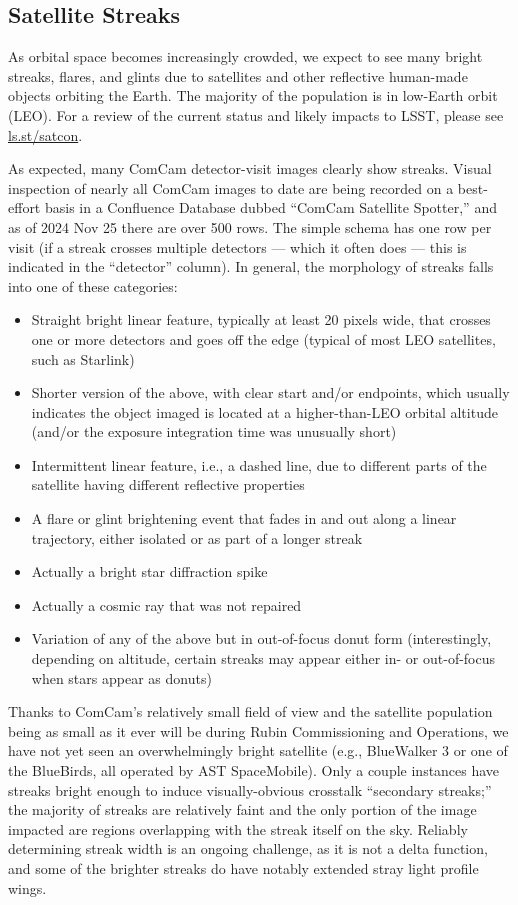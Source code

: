 \subsection{Satellite Streaks}

As orbital space becomes increasingly crowded, we expect to see many bright streaks, flares, and glints due to satellites and other reflective human-made objects orbiting the Earth. The majority of the population is in low-Earth orbit (LEO). For a review of the current status and likely impacts to LSST, please see \url{ls.st/satcon}.

As expected, many ComCam detector-visit images clearly show streaks. Visual inspection of nearly all ComCam images to date are being recorded on a best-effort basis in a Confluence Database dubbed ``ComCam Satellite Spotter,'' and as of 2024 Nov 25 there are over 500 rows. The simple schema has one row per visit (if a streak crosses multiple detectors --- which it often does --- this is indicated in the ``detector'' column). In general, the morphology of streaks falls into one of these categories:
\begin{itemize}
\item Straight bright linear feature, typically at least 20 pixels wide, that crosses one or more detectors and goes off the edge (typical of most LEO satellites, such as Starlink)
\item Shorter version of the above, with clear start and/or endpoints, which usually indicates the object imaged is located at a higher-than-LEO orbital altitude (and/or the exposure integration time was unusually short)
\item Intermittent linear feature, i.e., a dashed line, due to different parts of the satellite having different reflective properties
\item A flare or glint brightening event that fades in and out along a linear trajectory, either isolated or as part of a longer streak
\item Actually a bright star diffraction spike
\item Actually a cosmic ray that was not repaired
\item Variation of any of the above but in out-of-focus donut form (interestingly, depending on altitude, certain streaks may appear either in- or out-of-focus when stars appear as donuts)
\end{itemize}

Thanks to ComCam's relatively small field of view and the satellite population being as small as it ever will be during Rubin Commissioning and Operations, we have not yet seen an overwhelmingly bright satellite (e.g., BlueWalker 3 or one of the BlueBirds, all operated by AST SpaceMobile). Only a couple instances have streaks bright enough to induce visually-obvious crosstalk ``secondary streaks;'' the majority of streaks are relatively faint and the only portion of the image impacted are regions overlapping with the streak itself on the sky. Reliably determining streak width is an ongoing challenge, as it is not a delta function, and some of the brighter streaks do have notably extended stray light profile wings.

